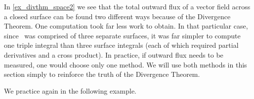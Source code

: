 In \autoref{ex_divthm_space2} we see that the total outward flux of a vector field across a closed surface can be found two different ways because of the Divergence Theorem. One computation took far less work to obtain. In that particular case, since \surfaceS\ was comprised of three separate surfaces, it was far simpler to compute one triple integral than three surface integrals (each of which required partial derivatives and a cross product). In practice, if outward flux needs to be measured, one would choose only one method. We will use both methods in this section simply to reinforce the truth of the Divergence Theorem.

We practice again in the following example.


